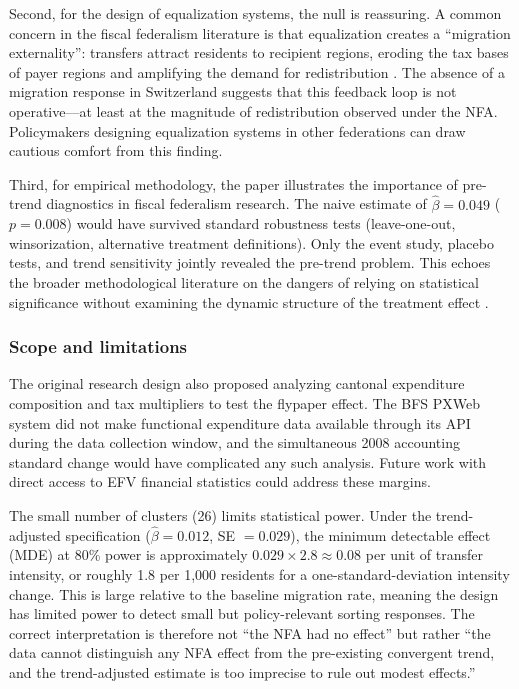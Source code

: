 \documentclass[12pt]{article}
\begin{document}
Second, for the design of equalization systems, the null is reassuring. A common concern in the fiscal federalism literature is that equalization creates a ``migration externality'': transfers attract residents to recipient regions, eroding the tax bases of payer regions and amplifying the demand for redistribution \citep{boadway2004fiscal}. The absence of a migration response in Switzerland suggests that this feedback loop is not operative---at least at the magnitude of redistribution observed under the NFA. Policymakers designing equalization systems in other federations can draw cautious comfort from this finding.

Third, for empirical methodology, the paper illustrates the importance of pre-trend diagnostics in fiscal federalism research. The naive estimate of $\hat{\beta} = 0.049$ ($p = 0.008$) would have survived standard robustness tests (leave-one-out, winsorization, alternative treatment definitions). Only the event study, placebo tests, and trend sensitivity jointly revealed the pre-trend problem. This echoes the broader methodological literature on the dangers of relying on statistical significance without examining the dynamic structure of the treatment effect \citep{roth2023pretest, rambachan2023more, sun2021estimating}.

\subsubsection*{Scope and limitations} The original research design also proposed analyzing cantonal expenditure composition and tax multipliers to test the flypaper effect. The BFS PXWeb system did not make functional expenditure data available through its API during the data collection window, and the simultaneous 2008 accounting standard change would have complicated any such analysis. Future work with direct access to EFV financial statistics could address these margins.

The small number of clusters (26) limits statistical power. Under the trend-adjusted specification ($\hat{\beta} = 0.012$, SE $= 0.029$), the minimum detectable effect (MDE) at 80\% power is approximately $0.029 \times 2.8 \approx 0.08$ per unit of transfer intensity, or roughly 1.8 per 1,000 residents for a one-standard-deviation intensity change. This is large relative to the baseline migration rate, meaning the design has limited power to detect small but policy-relevant sorting responses. The correct interpretation is therefore not ``the NFA had no effect'' but rather ``the data cannot distinguish any NFA effect from the pre-existing convergent trend, and the trend-adjusted estimate is too imprecise to rule out modest effects.''
\end{document}
